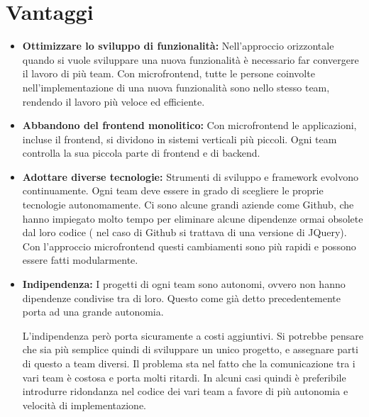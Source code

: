\section{Vantaggi}
\begin{itemize}
    \item \textbf{Ottimizzare lo sviluppo di funzionalità:}
Nell’approccio orizzontale quando si vuole sviluppare una nuova funzionalità è necessario far convergere il 
lavoro di più team. Con microfrontend,
  tutte le persone coinvolte nell’implementazione di una nuova funzionalità sono nello 
  stesso team, rendendo il lavoro più veloce ed efficiente. 
    \item \textbf{Abbandono del frontend monolitico:}
Con microfrontend le applicazioni, incluse il frontend, si dividono in sistemi verticali
 più piccoli. Ogni team controlla la sua piccola parte di frontend e di backend.
    \item \textbf{Adottare diverse tecnologie:}
Strumenti di sviluppo e framework evolvono continuamente. Ogni team deve essere in grado di scegliere
le proprie tecnologie autonomamente. Ci sono alcune grandi aziende
 come Github, che hanno
 impiegato molto tempo per eliminare alcune dipendenze ormai obsolete dal loro codice ( nel caso di Github si trattava di una versione di JQuery).
  Con l’approccio microfrontend questi cambiamenti sono più rapidi e possono essere
   fatti modularmente.


\item \textbf{Indipendenza:}
I progetti di ogni team sono autonomi, ovvero non hanno dipendenze condivise tra di loro.
Questo come già detto precedentemente porta ad una grande autonomia.

L’indipendenza però porta sicuramente a costi aggiuntivi. Si potrebbe pensare che sia
 più semplice quindi di sviluppare un unico progetto, e assegnare parti di questo a team diversi. 
 Il problema sta nel fatto che la comunicazione tra i vari team è costosa e porta molti ritardi.
In alcuni casi quindi è preferibile introdurre ridondanza nel codice dei vari team a favore di più autonomia e velocità di
 implementazione.

\end{itemize}

